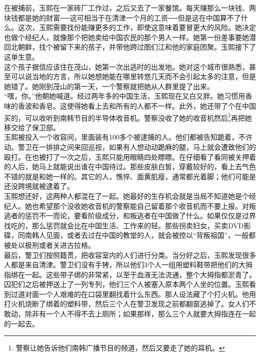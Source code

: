 在被捕前，玉熙在一家砖厂工作过，之后又去了一家餐馆。每天赚那么一块钱、两块钱都是她的财富──这可相当于在清津一个月的工资──但是这在中国算不了什么。这次，玉熙需要找份能赚更多的工作，即使这意味着要冒更大的风险。她决定也做个经纪人，就像那个把她卖给中国农民的那个男人一样。她第一份差事要她潜回北朝鲜，找个被留下来的孩子，并带他跨过图们江和他的家庭团聚。玉熙接下了这单生意。\\

这个孩子据信应该住在茂山，她第一次出逃时的出发地。她对这个城市很熟悉，甚至可以说当地的方言，所以她想她能在哪里转悠几天而不会引起太多的注意，但是她错了。她刚到茂山的第一天，一个警察就把她从人群里提了出来。\\

“嘿，你。”他朝她喊道。经过两年多的中国生活，玉熙现在又白又胖。她习惯用香味的香波和香皂。这使得她看上去和所有的人都不一样。此外，她还带了个在中国买的，可以收听到南韩节目的半导体收音机。警察没收了她的收音机然后\footnote{警察让她告诉他们南韩广播节目的频道，然后又要走了她的耳机。}再把她移交给了保卫部。\\

玉熙被投入一个收容间，里面装有100多个被逮捕的人。他们都被告知跪着，不许动。警卫在一排排之间来回巡视，如果有人想动动跪麻的腿，马上就会遭致他们的殴打。在也被打了一次之后，玉熙只能用眼睛四处瞟瞟。在仔细看了看同被关押着的人后，她马上就能说出谁在中国待过。那些皮肤白皙，穿戴较好的，看上去气色不错的就是和她一样的。其它的人，憔悴、面黄肌瘦，通常都光着脚；他们可能是还没跨境就被逮着了。\\

玉熙想还好，这两种人都混在了一起。她最好的生存机会就是当局不知道她是个经纪人。她也希望那个没收她收音机的警察能自己留着那个收音机而不要上报。对叛逃者的惩罚不一而论，要看阶级成分，和叛逃者在中国做了什么。如果仅仅是过界找吃的，那么惩罚就会比在中国生活、工作来的轻。那些拐卖妇女，买卖DVD影碟，同南韩人见面，或者去过在中国的教堂的人，就会被控以“背叛祖国”，一般都被处以极刑或者关进古拉格。\\

最后，警卫们按照籍贯，把收容室内的人们进行分类。当分好之后，玉熙发现很多人都是来自清津。警卫们没有手铐，所以他们3个人一组用塑料鞋带把他们的大拇指绑在一起。这些带子绑的非常紧，以至于血液无法流通，整个大拇指都淤青了。囚犯们之后被押送上了一列专列，他们三个人被塞入原本两个人坐的位置。玉熙看到过道对面一个人艰难的在口袋里翻找着什么东西。那人设法藏了个打火机。他用打火机烧断了绑着的塑料带，然后三个人在警卫发现之前都翻窗逃掉了。女人们不敢动，除非有一个人不得不去上厕所；如果那样，那么三个人就要大拇指连在一起的一起去。\\

